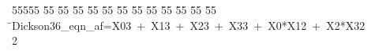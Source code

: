 %
%
\begin{tabbing}
55555 \= 55 \= 55 \= 55 \= 55 \= 55 \= 55 \= 55 \= 55 \= 55 \= 55 \= 55 \= 55 \= \>Dickson36\_eqn\_af=X03\ +\ X13\ +\ X23\ +\ X33\ +\ X0*X12\ +\ X2*X32\\[0pt]
2\>\end{tabbing}
